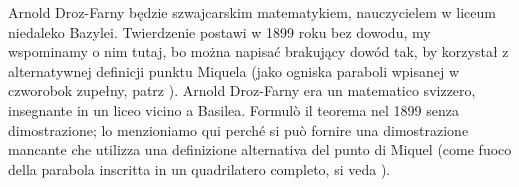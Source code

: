
Arnold Droz-Farny będzie szwajcarskim matematykiem, nauczycielem w liceum niedaleko Bazylei. %
Twierdzenie postawi w 1899 roku bez dowodu, my wspominamy o nim tutaj, bo można napisać brakujący dowód tak, by korzystał z alternatywnej definicji punktu Miquela (jako ogniska paraboli wpisanej w czworobok zupełny, patrz \cite[s. 262]{neugebauer_2018}). %
Arnold Droz-Farny era un matematico svizzero, insegnante in un liceo vicino a Basilea. %
Formulò il teorema nel 1899 senza dimostrazione; lo menzioniamo qui perché si può fornire una dimostrazione mancante che utilizza una definizione alternativa del punto di Miquel (come fuoco della parabola inscritta in un quadrilatero completo, si veda \cite[p. 262]{neugebauer_2018}). %

%